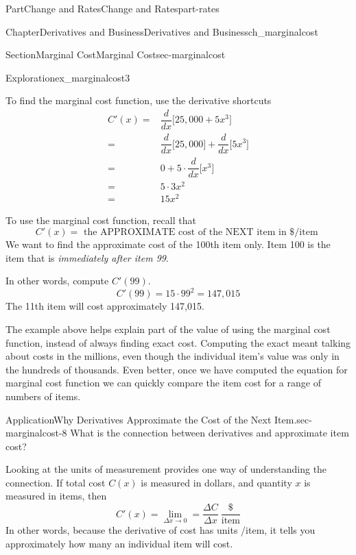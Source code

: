 \documentclass{tufte-book}
\numberwithin{equation}{chapter}
\newcommand{\ddx}[1]{ \dfrac{d}{dx} \Big[ #1 \Big]  }
\newcommand{\amp}{&}
\begin{document}
\begin{partptx}{Part}{Change and Rates}{}{Change and Rates}{}{}{part-rates}
\begin{chapterptx}{Chapter}{Derivatives and Business}{}{Derivatives and Business}{}{}{ch_marginalcost}
\begin{sectionptx}{Section}{Marginal Cost}{}{Marginal Cost}{}{}{sec-marginalcost}
\begin{exploration}{Exploration}{}{ex_marginalcost3}
\begin{enumerate}[font=\bfseries,label=(\alph*),ref=\alph*]
\par
To find the marginal cost function, use the derivative shortcuts%
\begin{align*}
C'(x) = \amp \ddx{ 25,000 + 5x^3 }\\
= \amp \ddx{25,000} + \ddx{5x^3}\\
= \amp 0 + 5\cdot \ddx{x^3}\\
= \amp 5 \cdot 3x^2\\
= \amp 15 x^2
\end{align*}
%
\par
To use the marginal cost function, recall that%
\begin{equation*}
C'(x) = \text{ the APPROXIMATE cost of the NEXT item in \$/item }
\end{equation*}
We want to find the approximate cost of the 100th item only. Item 100 is the item that is \emph{immediately after item 99}.%
\par
In other words, compute \(C'(99)\).%
\begin{equation*}
C'(99) = 15 \cdot 99^2 = 147,015
\end{equation*}
The 11th item will cost approximately \textdollar{}147,015.%
\end{enumerate}%
\end{exploration}%
The example above helps explain part of the value of using the marginal cost function, instead of always finding exact cost. Computing the exact meant talking about costs in the millions, even though the individual item's value was only in the hundreds of thousands. Even better, once we have computed the equation for marginal cost function we can quickly compare the item cost for a range of numbers of items.%
\begin{insight}{Application}{Why Derivatives Approximate the Cost of the Next Item.}{sec-marginalcost-8}%
What is the connection between derivatives and approximate item cost?%
\par
Looking at the units of measurement provides one way of understanding the connection.  If total cost \(C(x)\) is measured in dollars, and quantity \(x\) is measured in items, then%
\begin{equation*}
C'(x) = \lim_{\Delta x\rightarrow 0} = \dfrac{\Delta C}{\Delta x} \ \dfrac{\text{\$}}{\text{item}} 
\end{equation*}
In other words, because the derivative of cost has units \textdollar{}\slash{}item, it tells you approximately how many \textdollar{} an individual item will cost.%
\par

\end{insight}
\end{sectionptx}
\end{chapterptx}
\end{partptx}
\end{document}
